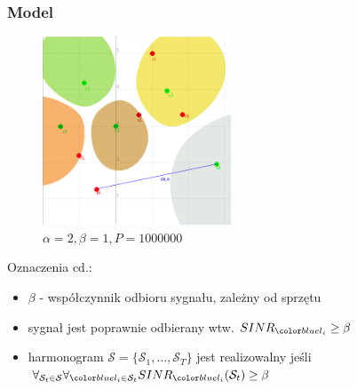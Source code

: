 \documentclass[polish, t,10pt]{beamer}
\begin{document}
    \begin{frame}
        \frametitle{Model}
        \begin{figure}
            \includegraphics[width=0.5\textwidth]{pictures/model-diagram3.png}
            \caption{$\alpha=2, \beta=1, P=1000000$}
        \end{figure}
        Oznaczenia cd.:
        \begin{itemize}
            \item $\beta$ - współczynnik odbioru sygnału, zależny od sprzętu
            \item sygnał jest poprawnie odbierany wtw. $SINR_{\li} \geq \beta$
            \item harmonogram $\mathcal{S} = \{\mathcal{S}_1, \ldots, \mathcal{S}_T\}$ jest realizowalny jeśli $\forall_{\mathcal{S}_t \in \mathcal{S}} \forall_{\li \in \mathcal{S}_t} SINR_{\li}(\mathcal{S}_t) \geq \beta$
        \end{itemize}
    \end{frame}
\end{document}
